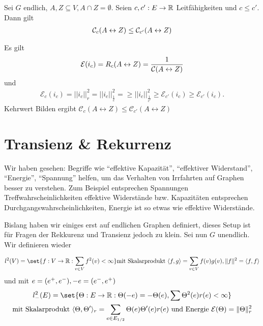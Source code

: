 \begin{satz}
	\label{satz:Rayleigh}
	Sei $G$ endlich, $A,Z \subseteq V, A \cap Z = \emptyset$. Seien $c,c' : E \to \mathbb{R}$ Leitfähigkeiten und $c \leq c'$. Dann gilt
	\begin{align}
		\mathcal{C}_c\enb{A \leftrightarrow Z} \leq \mathcal{C}_{c'} \enb{A \leftrightarrow Z}
	\end{align}
\end{satz}
\begin{beweis}
	Es gilt
	\begin{gather}
		\mathcal{E}(i_c) =  R_c(A \leftrightarrow Z) = \frac{1}{\leit{A \leftrightarrow Z}}
	\end{gather}
	und 
	\begin{gather}
		\mathcal{E}_c(i_c) = ||i_c||^2_r = ||i_c||^2_{\frac{1}{c}} =\geq ||i_c||^2_{\frac{1}{c'}} \geq \mathcal{E}_{c'}(i_c) \geq \mathcal{E}_{c'}(i_{c}).
	\end{gather}
	Kehrwert Bilden ergibt $\mathcal{C}_c(A \leftrightarrow Z) \leq \mathcal{C}_{c'} (A \leftrightarrow Z)$
\end{beweis}

\section{Transienz \& Rekurrenz}
\label{chap:TransienzUndRekurrenz}

Wir haben gesehen: Begriffe wie \enquote{effektive Kapazität}, \enquote{effektiver Widerstand}, \enquote{Energie}, \enquote{Spannung} helfen, um das Verhalten von Irrfahrten auf Graphen besser zu verstehen. Zum Beispiel entsprechen Spannungen Treffwahrscheinlichkeiten effektive Widerstände bzw. Kapazitäten entsprechen Durchgangswahrscheinlichkeiten, Energie ist so etwas wie effektive Widerstände.

Bislang haben wir einiges erst auf endlichen Graphen definiert, dieses Setup ist für Fragen der Rekkurenz und Transienz jedoch zu klein. Sei nun $G$ unendlich. Wir definieren wieder

\begin{gather}
	l^2(V) = \set{f:V \to \Real: \sum\limits_{v\in V} f^2(v)<\infty } \text{mit Skalarprodukt } \sprod{f,g} = \sum\limits_{v \in V} f(v)g(v),  \Norm{f}^2 = \sprod{f,f}
\end{gather}
und mit $e = \enb{e^+,e^-}, -e = \enb{e^-,e^+}$
\begin{gather}
	l^2_-(E) = \set{\Theta:E \to \Real: \Theta(-e) = -\Theta(e), \sum \Theta^2(e)r(e) < \infty} \\
	 \text{mit Skalarprodukt } \sprod{\Theta, \Theta'}_r = \sum\limits_{e \in E_{1/2}} \Theta(e)\Theta'(e)r(e) \text{ und Energie } \mathcal{E}(\Theta) = \Norm{\Theta}^2_r
\end{gather}


